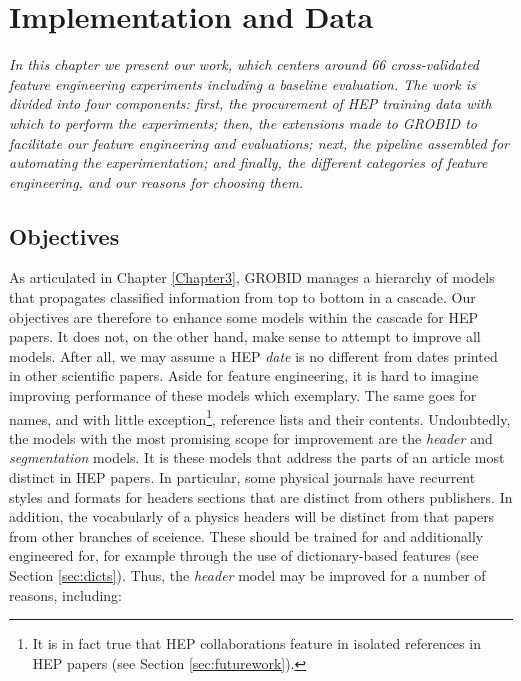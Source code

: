 
\chapter{Implementation and Data} %

\label{Chapter4} %


\emph{In this chapter we present our work, which centers around 66 cross-validated feature engineering experiments including a baseline evaluation. The work is divided into four components: first, the procurement of HEP training data with which to perform the experiments; then, the extensions made to GROBID to facilitate our feature engineering and evaluations; next, the pipeline assembled for automating the experimentation; and finally, the different categories of feature engineering, and our reasons for choosing them.}

\section{Objectives}

As articulated in Chapter \ref{Chapter3}, GROBID manages a hierarchy of models that propagates classified information from top to bottom in a cascade. Our objectives are therefore to enhance some models within the cascade for HEP papers. It does not, on the other hand, make sense to attempt to improve all models. After all, we may assume a HEP \emph{date} is no different from dates printed in other scientific papers. Aside for feature engineering, it is hard to imagine improving performance of these models which exemplary. The same goes for names, and with little exception\footnote{It is in fact true that HEP collaborations feature in isolated references in HEP papers (see Section \ref{sec:futurework}).}, reference lists and their contents. Undoubtedly, the models with the most promising scope for improvement are the \emph{header} and \emph{segmentation} models. It is these models that address the parts of an article most distinct in HEP papers. In particular, some physical journals have recurrent styles and formats for headers sections that are distinct from others publishers. In addition, the vocabularly of a physics headers will be distinct from that papers from other branches of sceience. These should be trained for and additionally engineered for, for example through the use of dictionary-based features (see Section \ref{sec:dicts}). Thus, the \emph{header} model may be improved for a number of reasons, including:

